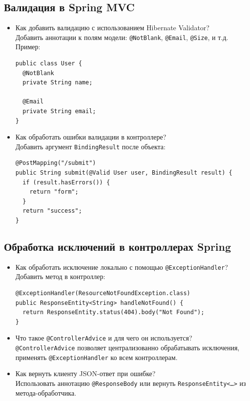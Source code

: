 \documentclass[a4paper,14pt]{article}
\begin{document}
\subsection{Валидация в Spring MVC}

\begin{itemize}
\item Как добавить валидацию с использованием Hibernate Validator? \\
Добавить аннотации к полям модели: \texttt{@NotBlank}, \texttt{@Email}, \texttt{@Size}, и т.д. \\
Пример:
\begin{lstlisting}[style=javastyle]
public class User {
  @NotBlank
  private String name;

  @Email
  private String email;
}
\end{lstlisting}

\item Как обработать ошибки валидации в контроллере? \\
Добавить аргумент \texttt{BindingResult} после объекта:
\begin{lstlisting}[style=javastyle]
@PostMapping("/submit")
public String submit(@Valid User user, BindingResult result) {
  if (result.hasErrors()) {
    return "form";
  }
  return "success";
}
\end{lstlisting}
\end{itemize}

\subsection{Обработка исключений в контроллерах Spring}

\begin{itemize}
\item Как обработать исключение локально с помощью \texttt{@ExceptionHandler}? \\
Добавить метод в контроллер:
\begin{lstlisting}[style=javastyle]
@ExceptionHandler(ResourceNotFoundException.class)
public ResponseEntity<String> handleNotFound() {
  return ResponseEntity.status(404).body("Not Found");
}
\end{lstlisting}

\item Что такое \texttt{@ControllerAdvice} и для чего он используется? \\
\texttt{@ControllerAdvice} позволяет централизованно обрабатывать исключения, применять \texttt{@ExceptionHandler} ко всем контроллерам.

\item Как вернуть клиенту JSON-ответ при ошибке? \\
Использовать аннотацию \texttt{@ResponseBody} или вернуть \texttt{ResponseEntity<\ldots>} из метода-обработчика.
\end{itemize}
\end{document}
